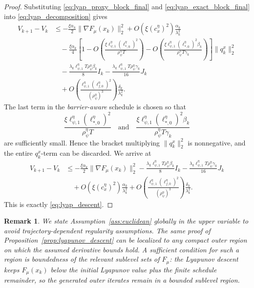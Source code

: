 \documentclass{article}
\newtheorem{remark}{Remark}
\begin{document}
\begin{proof}
Substituting \eqref{eq:lyap_proxy_block_final} and \eqref{eq:lyap_exact_block_final} into
\eqref{eq:lyap_decomposition} gives
\begin{align}
V_{k+1}-V_k
&\le
-\frac{\xi\alpha_k}{2}\|\nabla F_\mu(x_k)\|_2^2
+
O\!\left(\xi(c_x^\eta)^2\right)\frac{\alpha_k}{\lambda_k^2}
\nonumber\\
&\quad
-\frac{\xi\alpha_k}{4}
\left[
1
-
O\!\left(
\frac{\xi\ell_{\psi,1}^\eta(\ell_{*,0}^\eta)^2}{\rho_\psi^\eta T}
\right)
-
O\!\left(
\frac{\xi\ell_{\psi,1}^\eta(\ell_{*,0}^\eta)^2\beta_k}
{\rho_\psi^\eta T\gamma_k}
\right)
\right]
\|q_k^x\|_2^2
\nonumber\\
&\quad
-\frac{\lambda_k\ell_{\psi,1}^\eta T\rho_\psi^\eta\beta_k}{8}I_k
-\frac{\lambda_k\ell_{\psi,1}^\eta T\rho_\psi^\eta\gamma_k}{16}J_k
\nonumber\\
&\quad
+
O\!\left(
\frac{\ell_{\psi,1}^\eta(\ell_{f,0}^\eta)^2}{(\rho_\psi^\eta)^3}
\right)
\frac{\delta_k}{\lambda_k^2}.
\label{eq:lyap_before_q_absorption}
\end{align}
The last term in the \textit{barrier-aware} schedule is chosen so that
\[
\frac{\xi\ell_{\psi,1}^\eta(\ell_{*,0}^\eta)^2}{\rho_\psi^\eta T}
\quad\text{and}\quad
\frac{\xi\ell_{\psi,1}^\eta(\ell_{*,0}^\eta)^2\beta_k}{\rho_\psi^\eta T\gamma_k}
\]
are sufficiently small. Hence the bracket multiplying \(\|q_k^x\|_2^2\) is nonnegative, and the
entire \(q_k^x\)-term can be discarded. We arrive at
\begin{align}
V_{k+1}-V_k
&\le
-\frac{\xi\alpha_k}{2}\|\nabla F_\mu(x_k)\|_2^2
-\frac{\lambda_k\ell_{\psi,1}^\eta T\rho_\psi^\eta\beta_k}{8}I_k
-\frac{\lambda_k\ell_{\psi,1}^\eta T\rho_\psi^\eta\gamma_k}{16}J_k
\nonumber\\
&\quad
+
O\!\left(\xi(c_x^\eta)^2\right)\frac{\alpha_k}{\lambda_k^2}
+
O\!\left(
\frac{\ell_{\psi,1}^\eta(\ell_{f,0}^\eta)^2}{(\rho_\psi^\eta)^3}
\right)
\frac{\delta_k}{\lambda_k^2}.
\label{eq:lyap_descent_final}
\end{align}
This is exactly \eqref{eq:lyap_descent}.
\end{proof}


\begin{remark}
We state Assumption~\ref{ass:euclidean} globally in the upper variable to avoid trajectory-dependent
regularity assumptions. The same proof of Proposition~\ref{prop:lyapunov_descent} can be localized to any compact outer region on which the
assumed derivative bounds hold. A sufficient condition for such a region is boundedness of the
relevant sublevel sets of \(F_\mu\): the Lyapunov descent keeps \(F_\mu(x_k)\) below the initial
Lyapunov value plus the finite schedule remainder, so the generated outer iterates remain in a
bounded sublevel region.
\end{remark}
\end{document}
